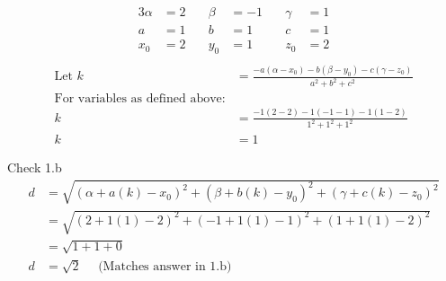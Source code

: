 \documentclass{article}
\begin{document}
\begin{alignat*}{3}
\alpha &= 2 \quad & \beta &= -1 \quad & \gamma &= 1 \\
a &= 1    \quad & b &= 1    \quad & c &= 1\\
x_0 &= 2    \quad & y_0 &= 1  \quad & z_0 &= 2\\
\end{alignat*}
\begin{align*}
\text{Let } k &= \frac{-a(\alpha - x_0) - b(\beta - y_0) - c(\gamma - z_0)}{a^2+b^2+c^2} \\
\text{For variables as defined above:} \\
k &= \frac{-1(2-2) - 1(-1-1) - 1(1-2)}{1^2 + 1^2 + 1^2} \\
k &= 1
\end{align*}

Check 1.b
\begin{align*}
d &= \sqrt{(\alpha + a(k) - x_0)^2 + (\beta + b(k) - y_0)^2 + (\gamma + c(k) - z_0)^2} \\
&= \sqrt{(2 + 1(1) - 2)^2 + (-1 + 1(1) - 1)^2 + (1 + 1(1) - 2)^2} \\
&= \sqrt{1 + 1 + 0} \\
d &= \sqrt{2} \quad \text{ (Matches answer in 1.b)}
\end{align*}
\end{document}
